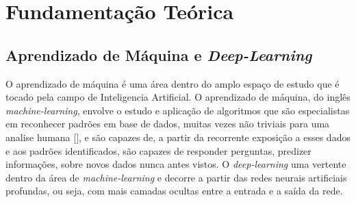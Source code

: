 \chapter{Fundamentação Teórica}



\section{Aprendizado de Máquina e \textit{Deep-Learning}}
O aprendizado de máquina é uma área dentro do amplo espaço de estudo que é tocado pela campo de Inteligencia Artificial. O aprendizado de máquina, do inglês \textit{machine-learning}, envolve o estudo e aplicação de algoritmos que são especialistas em reconhecer padrões em base de dados, muitas vezes não triviais para uma analise humana [], e são capazes de, a partir da recorrente exposição a esses dados e aos padrões identificados, são capazes de responder perguntas, predizer informações, sobre novos dados nunca antes vistos. O \textit{deep-learning} uma vertente dentro da área de \textit{machine-learning} e decorre a partir das redes neurais artificiais profundas, ou seja, com mais camadas ocultas entre a entrada e a saída da rede.

